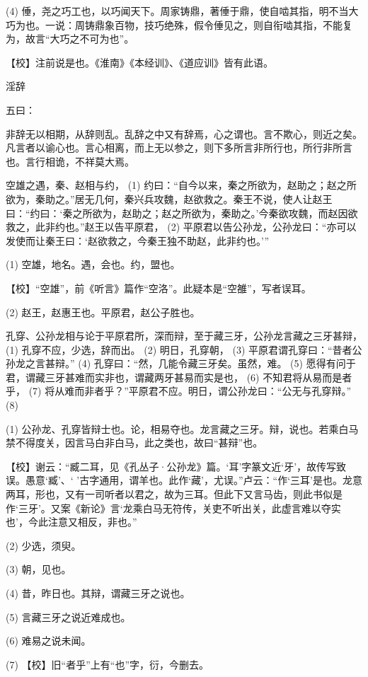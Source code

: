 \documentclass[12pt,UTF8]{ctexbook}
\begin{document}
(4) 倕，尧之巧工也，以巧闻天下。周家铸鼎，著倕于鼎，使自啮其指，明不当大巧为也。一说：周铸鼎象百物，技巧绝殊，假令倕见之，则自衔啮其指，不能复为，故言“大巧之不可为也”。

【校】注前说是也。《淮南》《本经训》、《道应训》皆有此语。





淫辞


五曰：

非辞无以相期，从辞则乱。乱辞之中又有辞焉，心之谓也。言不欺心，则近之矣。凡言者以谕心也。言心相离，而上无以参之，则下多所言非所行也，所行非所言也。言行相诡，不祥莫大焉。

空雄之遇，秦、赵相与约， (1) 约曰：“自今以来，秦之所欲为，赵助之；赵之所欲为，秦助之。”居无几何，秦兴兵攻魏，赵欲救之。秦王不说，使人让赵王曰：“约曰：‘秦之所欲为，赵助之；赵之所欲为，秦助之。’今秦欲攻魏，而赵因欲救之，此非约也。”赵王以告平原君， (2) 平原君以告公孙龙，公孙龙曰：“亦可以发使而让秦王曰：‘赵欲救之，今秦王独不助赵，此非约也。’”

(1) 空雄，地名。遇，会也。约，盟也。

【校】“空雄”，前《听言》篇作“空洛”。此疑本是“空雒”，写者误耳。

(2) 赵王，赵惠王也。平原君，赵公子胜也。

孔穿、公孙龙相与论于平原君所，深而辩，至于藏三牙，公孙龙言藏之三牙甚辩， (1) 孔穿不应，少选，辞而出。 (2) 明日，孔穿朝， (3) 平原君谓孔穿曰：“昔者公孙龙之言甚辩。” (4) 孔穿曰：“然，几能令藏三牙矣。虽然，难。 (5) 愿得有问于君，谓藏三牙甚难而实非也，谓藏两牙甚易而实是也， (6) 不知君将从易而是者乎， (7) 将从难而非者乎？”平原君不应。明日，谓公孙龙曰：“公无与孔穿辩。” (8)

(1) 公孙龙、孔穿皆辩士也。论，相易夺也。龙言藏之三牙。辩，说也。若乘白马禁不得度关，因言马白非白马，此之类也，故曰“甚辩”也。

【校】谢云：“臧二耳，见《孔丛子·公孙龙》篇。‘耳’字篆文近‘牙’，故传写致误。愚意‘臧’、‘ ’古字通用，谓羊也。此作‘藏’，尤误。”卢云：“作‘三耳’是也。龙意两耳，形也，又有一司听者以君之，故为三耳。但此下又言马齿，则此书似是作‘三牙’。又案《新论》言‘龙乘白马无符传，关吏不听出关，此虚言难以夺实也’，今此注意又相反，非也。”

(2) 少选，须臾。

(3) 朝，见也。

(4) 昔，昨日也。其辩，谓藏三牙之说也。

(5) 言藏三牙之说近难成也。

(6) 难易之说未闻。

(7) 【校】旧“者乎”上有“也”字，衍，今删去。
\end{document}
